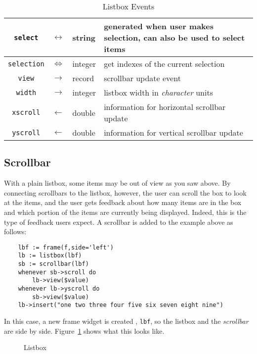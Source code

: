 \begin{table}[tbh]
{\begin{center}
\begin{tabular}{|c|c|p{0.7in}|p{3.1in}|}
{\tt select}	&$\leftrightarrow$&string& generated when user makes selection, can also be used to select items \\ \hline
{\tt selection}	&$\Leftrightarrow$&integer& get indexes of the current selection \\ \hline
{\tt view}	&$\rightarrow$&record& scrollbar update event \\ \hline
{\tt width}	&$\rightarrow$&integer& listbox width in {\em character} units \\ \hline
{\tt xscroll}	&$\leftarrow$&double& information for horizontal scrollbar update \\ \hline
{\tt yscroll}	&$\leftarrow$&double& information for vertical scrollbar update \\ \hline
\end{tabular}
\end{center}
}
\caption{ Listbox Events }
\label{tklistbox-events}
\end{table}

\subsection{Scrollbar}
\label{tkscrollbar}
\label{tkscrollbar-example}

With a plain listbox, some items may be out of view as you saw above. By connecting
scrollbars to the listbox, however, the user can scroll the box to look at the items,
and the user gets feedback about how many items are in the box and which portion of
the items are currently being displayed. Indeed, this is the type of feedback users
expect. A scrollbar is added to the example above as follows:
\begin{verbatim}
    lbf := frame(f,side='left')
    lb := listbox(lbf)
    sb := scrollbar(lbf)
    whenever sb->scroll do
        lb->view($value)
    whenever lb->yscroll do
        sb->view($value)
    lb->insert("one two three four five six seven eight nine")
\end{verbatim}
In this case, a new frame widget is created , {\tt lbf}, so the
listbox and the {\em scrollbar} are side by side. Figure~\ref{tklistbox} shows
what this looks like.

\begin{figure}[thb]
\centerline{}
\caption{ Listbox }
\label{tklistbox}
\end{figure}


